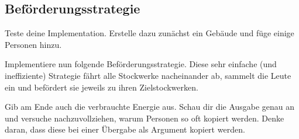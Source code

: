 

\subsection{Beförderungsstrategie}
Teste deine Implementation.
Erstelle dazu zunächst ein Gebäude und füge einige Personen hinzu.
%

%
Implementiere nun folgende Beförderungsstrategie.
Diese sehr einfache (und ineffiziente) Strategie fährt alle Stockwerke nacheinander ab, sammelt die Leute ein und befördert sie jeweils zu ihren Zielstockwerken.
%
\begin{algorithm}[H]
 \SetAlgoLined
\end{algorithm}
%
\noindent Gib am Ende auch die verbrauchte Energie aus.
Schau dir die Ausgabe genau an und versuche nachzuvollziehen, warum Personen so oft kopiert werden.
Denke daran, dass diese bei einer Übergabe als Argument kopiert werden.

